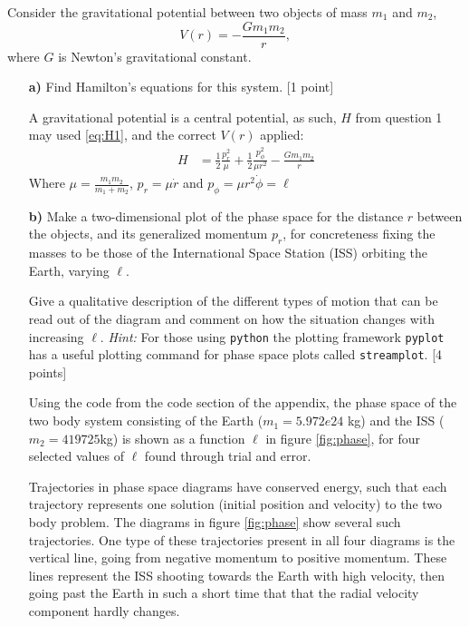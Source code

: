\documentclass[11pt,a4paper]{report}
\newcounter{excount}[chapter]
\newenvironment{exercise}[1][]{\addtocounter{excount}{1} \noindent {\bf Question
    \arabic{excount} \ \ #1}\hspace{2mm}}{\vspace{4mm}}
\begin{document}
\begin{exercise}{\bf Orbital motion\\}
Consider the gravitational potential between two objects of mass $m_1$ and $m_2$,
\begin{equation}
V(r)=-\frac{Gm_1m_2}{r},\label{eq:grav_pot}
\end{equation}
where $G$ is Newton's gravitational constant.
\begin{itemize}
\item[{\bf a)}] Find Hamilton's equations for this system. [1 point] \par

A gravitational potential is a central potential, as such, $H$ from question 1 may used \eqref{eq:H1}, and the correct $V(r)$ applied:
\begin{align}
H &=  \frac{1}{2} \frac{p_r^2}{\mu}  +\frac{1}{2}\frac{p_\phi^2}{\mu r^2}  -\frac{Gm_1m_2}{r}
\label{eq:2.a.H}
\end{align}
Where $\mu=\frac{m_1m_2}{m_1+m_2}$, $p_r=\mu \dot{r}$ and $p_\phi=\mu r^2 \dot{\phi}=\ell$
 \item[{\bf b)}] Make a two-dimensional plot of the phase space for the distance $r$ between the objects, and its generalized momentum $p_r$, for concreteness fixing the masses to be those of the International Space Station (ISS) orbiting the Earth, varying $\ell$.

Give a qualitative description of the different types of motion that can be read out of the diagram and comment on how the situation changes with increasing $\ell$. {\it Hint:} For those using {\tt python} the plotting framework {\tt pyplot} has a useful plotting command for phase space plots called {\tt streamplot}.  [4 points] \par 

Using the code from the code section of the appendix, the phase space of the two body system consisting of the Earth ($m_1=5.972e24$ kg) and the ISS ($m_2=419725$kg) is shown as a function $\ell$  in figure \ref{fig:phase}, for four selected values of $\ell$ found through trial and error. \par 

Trajectories in phase space diagrams have conserved energy, such that each trajectory represents one solution (initial position and velocity) to the two body problem. The diagrams in figure \ref{fig:phase} show several such trajectories. One type of these trajectories present in all four diagrams is the vertical line, going from negative momentum to positive momentum. These lines represent the ISS shooting towards the Earth with high velocity, then going past the Earth in such a short time that that the radial velocity component hardly changes. \par


\end{itemize}
\end{exercise}
\end{document}
